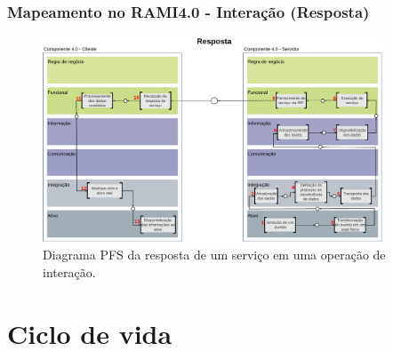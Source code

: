 \documentclass[10pt]{beamer}
\begin{document}
\begin{frame}
	\frametitle{Mapeamento no RAMI4.0 - Interação (Resposta)}
	
	\begin{figure}[htb]
		\centering
		\caption{Diagrama PFS da resposta de um serviço em uma operação de interação.}
		\label{fig:rami-interacao-resposta}
		\includegraphics[width=0.9\textwidth]{rami-interacao-resposta}

	\end{figure}
	
\end{frame}

\section{Ciclo de vida}
\end{document}
